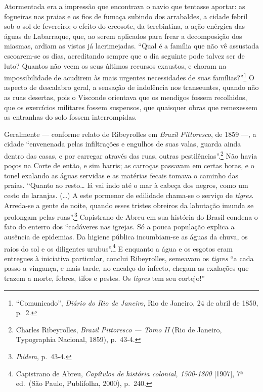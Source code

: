 Atormentada era a impressão que encontrava o navio que tentasse aportar:
as fogueiras nas praias e os fios de fumaça subindo dos arrabaldes, a
cidade febril sob o sol de fevereiro; o efeito do creosote, da
terebintina, a ação enérgica das águas de Labarraque, que, ao serem
aplicados para frear a decomposição dos miasmas, ardiam as vistas já
lacrimejadas. ``Qual é a família que não vê assustada escoarem-se os
dias, acreditando sempre que o dia seguinte pode talvez ser de luto?
Quantos não veem os seus últimos recursos exaustos, e choram na
impossibilidade de acudirem às mais urgentes necessidades de suas
famílias?''\footnote{``Comunicado'', \textit{Diário do Rio de Janeiro},
  Rio de Janeiro, 24 de abril de 1850, p.~2.} O aspecto de descalabro
geral, a sensação de indolência nos transeuntes, quando não as ruas
desertas, pois o Visconde orientava que os mendigos fossem recolhidos,
que os exercícios militares fossem suspensos, que quaisquer obras que
remexessem as entranhas do solo fossem interrompidas.

Geralmente --- conforme relato de Ribeyrolles em \textit{Brazil
Pittoresco}, de 1859 ---, a cidade ``envenenada pelas infiltrações e
engulhos de suas valas, guarda ainda dentro das casas, e por carregar
através das ruas, outras pestilências''.\footnote{Charles Ribeyrolles,
  \textit{Brazil Pittoresco --- Tomo II} (Rio de Janeiro, Typographia
  Nacional, 1859), p.~43-4.} Não havia poços na Corte de então, e sim
barris; as carroças passavam em certas horas, e o tonel exalando as
águas servidas e as matérias fecais tomava o caminho das praias.
``Quanto ao resto\dots{} lá vai indo até o mar à cabeça dos negros, como um
cesto de laranjas. (\ldots{}) A este pormenor de edilidade chama-se o
serviço de \textit{tigres}. Arreda-se a gente de noite, quando esses
tristes obreiros da labutação imunda se prolongam pelas
ruas''.\footnote{\textit{Ibidem}, p.~43-4.} Capistrano de Abreu em sua
história do Brasil condena o fato do enterro dos ``cadáveres nas
igrejas. Só a pouca população explica a ausência de epidemias. Da
higiene pública incumbiam-se as águas da chuva, os raios do sol e os
diligentes urubus''.\footnote{Capistrano de Abreu, \textit{Capítulos de
  história colonial, 1500-1800} {[}1907{]}, 7ª ed.~(São Paulo,
  Publifolha, 2000), p.~240.} E enquanto a água e os esgotos eram
entregues à iniciativa particular, conclui Ribeyrolles, semeavam os
\textit{tigres} ``a cada passo a vingança, e mais tarde, no encalço do
infecto, chegam as exalações que trazem a morte, febres, tifos e pestes.
Os \textit{tigres} tem seu cortejo!''

